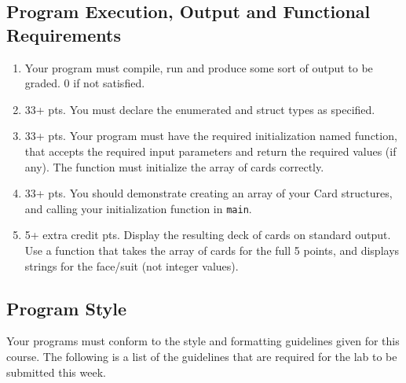 \documentclass[11pt]{article}
\begin{document}
\subsection*{Program Execution, Output and Functional Requirements}
\label{sec-5-1}

\begin{enumerate}
\item Your program must compile, run and produce some sort of output to be
graded. 0 if not satisfied.
\item 33+ pts.  You must declare the enumerated and struct types as
specified.
\item 33+ pts.  Your program must have the required initialization named
function, that accepts the required input parameters and return the
required values (if any).  The function must initialize the
array of cards correctly.
\item 33+ pts. You should demonstrate creating an array of your Card
structures, and calling your initialization function in \verb~main~.
\item 5+ extra credit pts.  Display the resulting deck of cards on
standard output.  Use a function that takes the array of cards
for the full 5 points, and displays strings for the face/suit
(not integer values).
\end{enumerate}

\subsection*{Program Style}
\label{sec-5-2}

Your programs must conform to the style and formatting guidelines given for this course.
The following is a list of the guidelines that are required for the lab to be submitted
this week.
\end{document}
